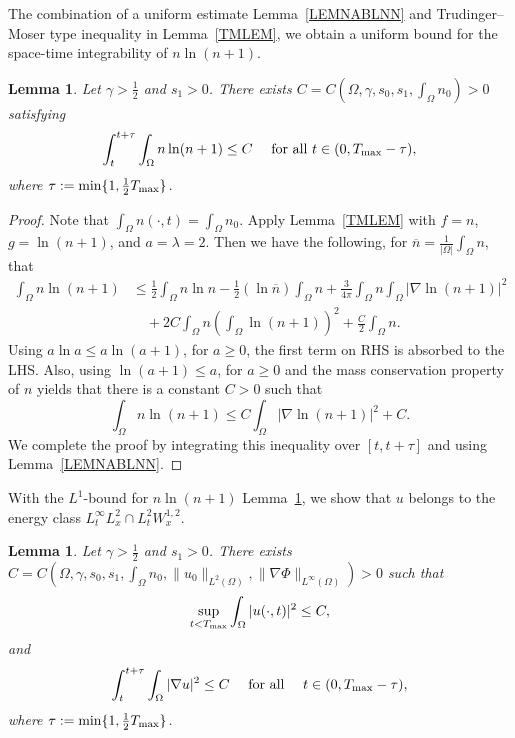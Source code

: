 \documentclass{amsart}
\newtheorem{lemma}[defn]{Lemma}
\numberwithin{equation}{section}
\begin{document}
The combination of a uniform estimate Lemma~\ref{LEMNABLNN} and Trudinger--Moser type inequality in Lemma~\ref{TMLEM}, we obtain a uniform bound for the space-time integrability of $n\ln(n+1)$.

\begin{lemma}\label{LEMLLNL}
Let $\gamma>\frac{1}{2}$ and $s_{1}>0$.
There exists $C=C(\Omega, \gamma, s_{0}, s_{1}, \int_{\Omega}n_{0})>0$ satisfying
\[
\int_{t}^{t+\tau}\int_{\Omega} n \ln(n+1) \le C\quad\mbox{ for all }t\in(0,T_{\rm max}-\tau),
\]
where $\tau:=\min\{1,\frac{1}{2}T_{\rm max}\}$.
\end{lemma}

\begin{proof}
Note that $\int_{\Omega} n (\cdot, t) = \int_{\Omega} n_0$. Apply Lemma~\ref{TMLEM} with $f=n$, $g=\ln(n+1)$, and $a=\lambda=2$. Then we have the following, for $\overline{n}=\frac{1}{|\Omega|}\int_\Omega n$, that 
\[
\begin{aligned}
\int_{\Omega} n \ln(n+1)
&\le \frac{1}{2}\int_{\Omega} n\ln n-\frac{1}{2}(\ln\overline{n})\int_{\Omega} n + \frac{3}{4\pi} \int_{\Omega}n \int_{\Omega}|\nabla \ln(n+1)|^{2}
\\&
\quad+2C\int_{\Omega}n\left(\int_{\Omega}\ln(n+1)\right)^{2}+\frac{C}{2}\int_{\Omega}n.
\end{aligned}
\]
Using $a\ln a\le a\ln (a+1)$, for $a\geq 0$, the first term on RHS is absorbed to the LHS. Also, using $\ln (a+1)\le a$, for $a\ge0$ and the mass conservation property of $n$ yields that there is a constant $C>0$ such that 
\[
\int_{\Omega} n \ln(n+1)
\le C\int_{\Omega}|\nabla \ln(n+1)|^{2} + C.
\]
We complete the proof by integrating this inequality over $[t,t+\tau]$ and using Lemma~\ref{LEMNABLNN}. 
\end{proof}


With the $L^1$-bound for $n\ln(n+1)$ Lemma~\ref{LEMLLNL}, we show that $u$ belongs to the energy class $L^\infty_t L^2_x \cap L^2_t W^{1,2}_x$.

\begin{lemma}\label{UBDD}
Let $\gamma>\frac{1}{2}$ and $s_{1}>0$. 
There exists $C=C(\Omega, \gamma, s_0, s_1, \int_{\Omega}n_0, \|u_0\|_{L^2(\Omega)}, \|\nabla \Phi\|_{L^{\infty}(\Omega)})>0$ such that
\begin{equation}\label{UBDD01}
\sup_{t<T_{\rm max}}\int_{\Omega}|u(\cdot,t)|^{2}\le C,
\end{equation}
and 
\begin{equation}\label{UBDD02}
\int_{t}^{t+\tau}\int_{\Omega}|\nabla u|^{2}\le  C\quad\mbox{ for all }\quad t\in(0,T_{\rm max}-\tau),
\end{equation}
where $\tau:=\min\{1,\frac{1}{2}T_{\rm max}\}$.
\end{lemma}
\end{document}
